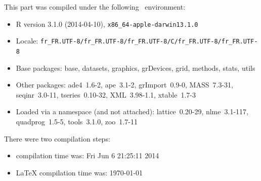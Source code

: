 \documentclass{article}
\begin{document}
\begin{scriptsize}

This part was compiled under the following \Rlogo{}~environment:

\begin{itemize}\raggedright
  \item R version 3.1.0 (2014-04-10), \verb|x86_64-apple-darwin13.1.0|
  \item Locale: \verb|fr_FR.UTF-8/fr_FR.UTF-8/fr_FR.UTF-8/C/fr_FR.UTF-8/fr_FR.UTF-8|
  \item Base packages: base, datasets, graphics, grDevices, grid,
    methods, stats, utils
  \item Other packages: ade4~1.6-2, ape~3.1-2, grImport~0.9-0,
    MASS~7.3-31, seqinr~3.0-11, tseries~0.10-32, XML~3.98-1.1,
    xtable~1.7-3
  \item Loaded via a namespace (and not attached): lattice~0.20-29,
    nlme~3.1-117, quadprog~1.5-5, tools~3.1.0, zoo~1.7-11
\end{itemize}
There were two compilation steps:

\begin{itemize}
  \item \Rlogo{} compilation time was: Fri Jun  6 21:25:11 2014
  \item \LaTeX{} compilation time was: \today
\end{itemize}

\end{scriptsize}



\clearpage
{}


\end{document}

